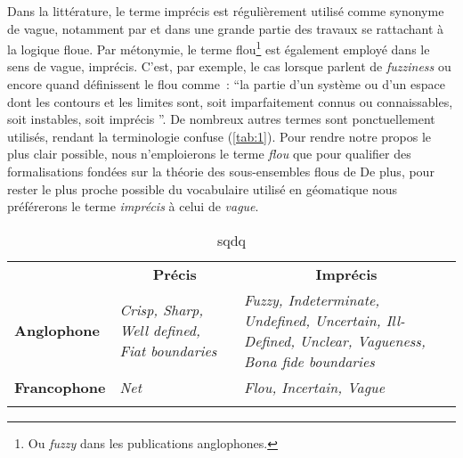 Dans la littérature, le terme imprécis est régulièrement utilisé comme
synonyme de vague, notamment par \textcite{Zadeh1965} et dans une
grande partie des travaux se rattachant à la logique floue. Par
métonymie, le terme flou\footnote{Ou \emph{fuzzy} dans les
  publications anglophones.} est également employé dans le sens de
vague, imprécis. C’est, par exemple, le cas lorsque
\textcite{Lagacherie1996} parlent de \emph{fuzziness} ou encore quand
\textcite[218]{Brunet1992} définissent le flou comme : \enquote{la
  partie d’un système ou d’un espace dont les contours et les limites
  sont, soit imparfaitement connus ou connaissables, soit instables,
  soit imprécis \textelp{}}. De nombreux autres termes sont
ponctuellement utilisés, rendant la terminologie confuse
(\autoref{tab:1}). Pour rendre notre propos le plus clair possible, nous
n’emploierons le terme \emph{flou} que pour qualifier des
formalisations fondées sur la théorie des sous-ensembles flous de
 De plus, pour rester le plus proche possible du
vocabulaire utilisé en géomatique nous préférerons le terme
\emph{imprécis} à celui de \emph{vague}.

\begin{table}
  \centering
  \begin{tabular}{lm{5cm}m{5cm}}
    \firsthline
    &\multicolumn{1}{c}{\textbf{Précis}} & \multicolumn{1}{c}{\textbf{Imprécis}}\\
    \cline{2-3}
    \textbf{Anglophone}&\emph{Crisp, Sharp, Well defined, Fiat boundaries} &\emph{Fuzzy, Indeterminate, Undefined, Uncertain, Ill-Defined, Unclear, Vagueness, Bona fide boundaries}\\
    \textbf{Francophone}&\emph{Net}&\emph{Flou, Incertain, Vague}\\
    \lasthline
  \end{tabular}
  \caption{sqdq}
  \label{tab:1}
\end{table}

